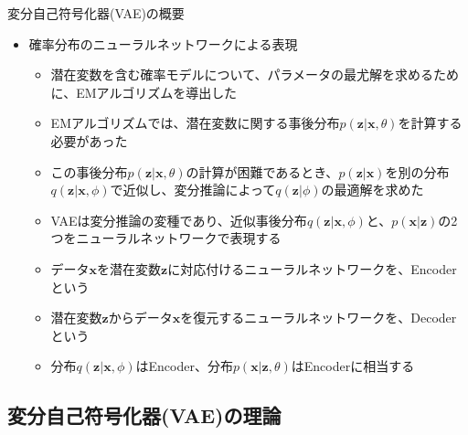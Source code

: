\documentclass[dvipdfmx,notheorems,t]{beamer}
\begin{document}
\begin{frame}{変分自己符号化器(VAE)の概要}

\begin{itemize}
	\item 確率分布のニューラルネットワークによる表現
	\begin{itemize}
		\item 潜在変数を含む確率モデルについて、パラメータの最尤解を求めるために、EMアルゴリズムを導出した
		\item EMアルゴリズムでは、潜在変数に関する事後分布$p(\bm{z} | \bm{x}, \theta)$を計算する必要があった
		\item この事後分布$p(\bm{z} | \bm{x}, \theta)$の計算が困難であるとき、$p(\bm{z} | \bm{x})$を別の分布$q(\bm{z} | \bm{x}, \phi)$で近似し、変分推論によって$q(\bm{z} | \phi)$の最適解を求めた
		\newline
		\item VAEは変分推論の変種であり、近似事後分布$q(\bm{z} | \bm{x}, \phi)$と、$p(\bm{x} | \bm{z})$の2つを\alert{ニューラルネットワーク}で表現する
		\newline
		\item データ$\bm{x}$を潜在変数$\bm{z}$に対応付けるニューラルネットワークを、\alert{Encoder}という
		\item 潜在変数$\bm{z}$からデータ$\bm{x}$を復元するニューラルネットワークを、\alert{Decoder}という
		\item 分布$q(\bm{z} | \bm{x}, \phi)$は\alert{Encoder}、分布$p(\bm{x} | \bm{z}, \theta)$は\alert{Encoder}に相当する
	\end{itemize}
\end{itemize}

\end{frame}

\subsection{変分自己符号化器(VAE)の理論}
\end{document}

